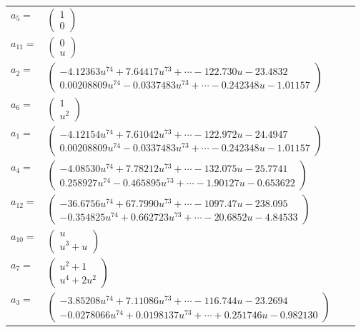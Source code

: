 \documentclass[1p]{elsarticle_modified}
\theoremstyle{definition}
\begin{document}
\begin{tabular}{m{7pt} m{180pt} m{7pt} m{180pt} }
\flushright $a_{5}=$&$\begin{pmatrix}1\\0\end{pmatrix}$ \\
\flushright $a_{11}=$&$\begin{pmatrix}0\\u\end{pmatrix}$ \\
\flushright $a_{2}=$&$\begin{pmatrix}-4.12363 u^{74}+7.64417 u^{73}+\cdots-122.730 u-23.4832\\0.00208809 u^{74}-0.0337483 u^{73}+\cdots-0.242348 u-1.01157\end{pmatrix}$ \\
\flushright $a_{6}=$&$\begin{pmatrix}1\\u^2\end{pmatrix}$ \\
\flushright $a_{1}=$&$\begin{pmatrix}-4.12154 u^{74}+7.61042 u^{73}+\cdots-122.972 u-24.4947\\0.00208809 u^{74}-0.0337483 u^{73}+\cdots-0.242348 u-1.01157\end{pmatrix}$ \\
\flushright $a_{4}=$&$\begin{pmatrix}-4.08530 u^{74}+7.78212 u^{73}+\cdots-132.075 u-25.7741\\0.258927 u^{74}-0.465895 u^{73}+\cdots-1.90127 u-0.653622\end{pmatrix}$ \\
\flushright $a_{12}=$&$\begin{pmatrix}-36.6756 u^{74}+67.7990 u^{73}+\cdots-1097.47 u-238.095\\-0.354825 u^{74}+0.662723 u^{73}+\cdots-20.6852 u-4.84533\end{pmatrix}$ \\
\flushright $a_{10}=$&$\begin{pmatrix}u\\u^3+u\end{pmatrix}$ \\
\flushright $a_{7}=$&$\begin{pmatrix}u^2+1\\u^4+2 u^2\end{pmatrix}$ \\
\flushright $a_{3}=$&$\begin{pmatrix}-3.85208 u^{74}+7.11086 u^{73}+\cdots-116.744 u-23.2694\\-0.0278066 u^{74}+0.0198137 u^{73}+\cdots+0.251746 u-0.982130\end{pmatrix}$ \\

\end{tabular}
\end{document}
